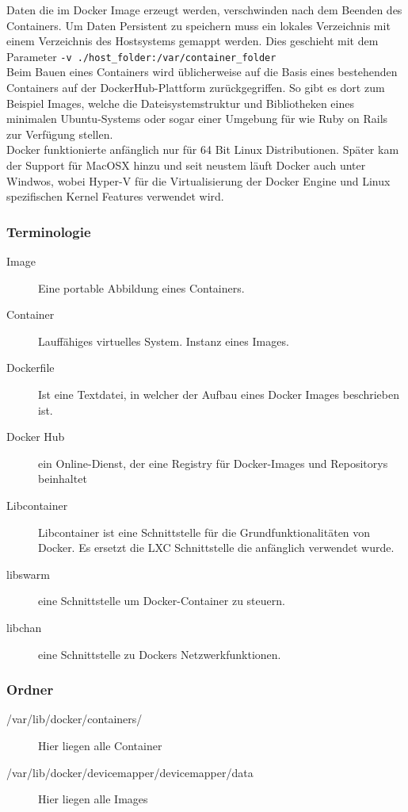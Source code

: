 Daten die im Docker Image erzeugt werden, verschwinden nach dem Beenden des Containers. Um Daten Persistent zu speichern muss ein lokales Verzeichnis mit einem Verzeichnis des Hostsystems gemappt werden. Dies geschieht mit dem Parameter \lstinline[]|-v ./host_folder:/var/container_folder| \\

Beim Bauen eines Containers wird üblicherweise auf die Basis eines bestehenden Containers auf der DockerHub-Plattform zurückgegriffen. So gibt es dort zum Beispiel Images, welche die Dateisystemstruktur und Bibliotheken eines minimalen Ubuntu-Systems oder sogar einer Umgebung für  wie Ruby on Rails zur Verfügung stellen. \\

Docker funktionierte anfänglich nur für 64 Bit Linux Distributionen. Später kam der Support für MacOSX hinzu und seit neustem läuft Docker auch unter Windwos, wobei Hyper-V für die Virtualisierung der Docker Engine und Linux spezifischen Kernel Features verwendet wird.

\subsubsection{Terminologie}
\begin{description}
	\item[Image] Eine portable Abbildung eines Containers.
	\item[Container] Lauffähiges virtuelles System. Instanz eines Images.
	\item[Dockerfile] Ist eine Textdatei, in welcher der Aufbau eines Docker Images beschrieben ist.
	\item[Docker Hub] ein Online-Dienst, der eine Registry für Docker-Images und Repositorys beinhaltet
	\item[Libcontainer] Libcontainer ist eine Schnittstelle für die Grundfunktionalitäten von Docker. Es ersetzt die LXC Schnittstelle die anfänglich verwendet wurde. 
	\item[libswarm]eine Schnittstelle um Docker-Container zu steuern.
	\item[libchan] eine Schnittstelle zu Dockers Netzwerkfunktionen.
\end{description}

\subsubsection{Ordner}
\begin{description}
	\item[/var/lib/docker/containers/] Hier liegen alle Container
	\item[/var/lib/docker/devicemapper/devicemapper/data] Hier liegen alle Images
\end{description}

